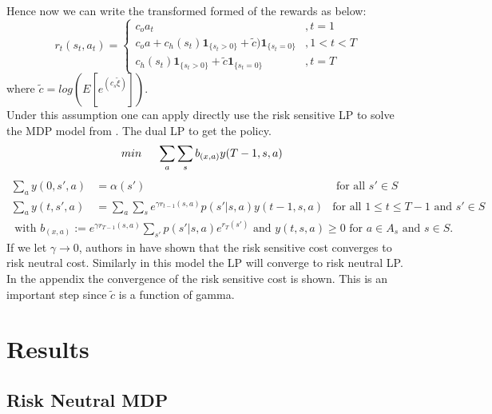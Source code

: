 \documentclass[11pt,a4paper,oneside]{report}
\begin{document}
Hence now we can write the transformed formed of the rewards as below:
\begin{equation*}
r_t(s_t,a_t)=
\begin{cases}
c_{o}a_t&,t=1\\
c_{o}a + c_h(s_t)\mathbf{1}_{\lbrace s_t>0\rbrace} + \tilde{c})\mathbf{1}_{\lbrace s_t=0\rbrace}&,1<t< T\\
c_h(s_t)\mathbf{1}_{\lbrace s_t>0\rbrace} +\tilde{c}\mathbf{1}_{\lbrace s_t=0\rbrace}&,t=T
\end{cases}
\end{equation*}
where $\tilde{c} = log(E[e^{(c_s \tilde{\xi})}]). $\\
Under this assumption one can apply directly use the risk sensitive LP to solve the MDP model from \citep{kumar2015finite}. The dual LP to get the policy.
\begin{align*}
min\hspace{0.5cm} \sum_a &\sum_{s} b_{(x,a)}y(T-1,s,a)
\end{align*}
\begin{align*}
\sum_a y(0,s',a)&=\alpha(s')     &\text{ for all } s'\in S \\
\sum_a y(t,s',a)&= \sum_a \sum_s e^{\gamma r_{t-1}(s,a)}p(s'|s,a)y(t-1,s,a) &\text{for all } 1\leq t\leq T-1 \text{ and } s'\in S
\end{align*}
\begin{align*}
\text{ with } b_{(x,a)}:= e^{\gamma r_{T-1}(s,a)}\sum_{s'} p(s'|s,a)e^{r_T(s')} \text{ and } y(t,s,a)\geq 0 \text{ for } a\in A_s \text{ and } s\in S.
\end{align*}
If we let $\gamma\rightarrow0$, authors in \citep{kumar2015finite} have shown that the risk sensitive cost converges to risk neutral cost. Similarly in this model the LP will converge to risk neutral LP. In the appendix the convergence of the risk sensitive cost is shown. This is an important step since $\tilde c$ is a function of gamma.

\chapter{Results}
\section{Risk Neutral MDP}
\end{document}

